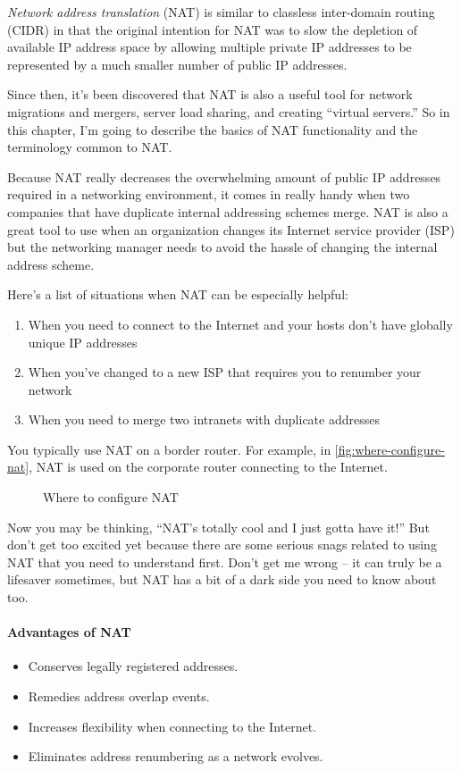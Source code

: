 \documentclass[b5paper,11pt]{memoir}
\begin{document}
\emph{Network address translation} (NAT) is similar to classless inter-domain routing (CIDR) in that the original intention for NAT was to slow
the depletion of available IP address space by allowing multiple
private IP addresses to be represented by a much smaller number of public IP addresses.

Since then, it's been discovered that NAT is also a useful tool for network migrations and mergers, server load sharing, and creating
``virtual servers.''
So in this chapter, I'm going to describe the basics of NAT functionality and the terminology common to NAT.

Because NAT really decreases the overwhelming amount of public IP addresses required in a networking environment, it comes in really handy
when two companies that have duplicate internal addressing schemes merge. NAT is also a great tool to use when an organization changes its
Internet service provider (ISP) but the networking manager needs to avoid the hassle of changing the internal address scheme.

Here's a list of situations when NAT can be especially helpful:

\begin{enumerate}
   \item When you need to connect to the Internet and your hosts don't have   globally unique IP addresses
   \item When you've changed   to a new ISP that requires you to renumber your network
   \item When you need to merge two intranets with duplicate addresses
\end{enumerate}

You typically use NAT on a border router.
For example, in \vref{fig:where-configure-nat}, NAT is used on the corporate router connecting to the Internet.

\begin{figure}
   \caption{Where to configure NAT}
   \label{fig:where-configure-nat}
\end{figure}

Now you may be thinking, ``NAT's totally cool and I just gotta have it!''
But don't get too excited yet because there are some serious snags related to using NAT that you need to understand first.
Don't get me wrong -- it can truly be a lifesaver sometimes, but NAT has a bit of a dark side you need to know about too.

\paragraph{Advantages of NAT}
\begin{itemize}
   \item Conserves legally registered addresses.
   \item Remedies address overlap events.
   \item Increases flexibility when connecting to the Internet.
   \item Eliminates address renumbering as a network evolves.
\end{itemize}
\end{document}
